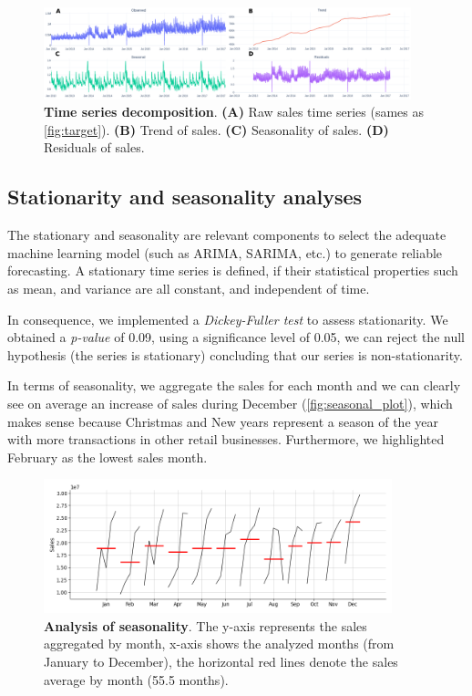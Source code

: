 \begin{figure}[!htb]
  \centering
  \includegraphics[width=0.95\textwidth]{plots/eda/timseries_decomposition.png}
  \caption[Time series decomposition]{\textbf{Time series decomposition}. \textbf{(A)} Raw sales time series (sames as \autoref{fig:target}). \textbf{(B)} Trend of sales. \textbf{(C)} Seasonality of sales. \textbf{(D)} Residuals of sales. }
  \label{fig:ts-decomposition}
\end{figure}

\subsection[Stationarity and seasonality analyses]{Stationarity and seasonality analyses}
\label{sec:st_s_analysis}


The stationary and seasonality are relevant components to select the adequate machine learning model (such as ARIMA, SARIMA, etc.) to generate reliable forecasting. A stationary time series is defined, if their statistical properties such as mean, and variance are all constant, and independent of time.

In consequence, we implemented a \textit{Dickey-Fuller test} to assess stationarity. We obtained a \textit{p-value} of 0.09, using a significance level of 0.05, we can reject the null hypothesis (the series is stationary) concluding that our series is non-stationarity.

In terms of seasonality, we aggregate the sales for each month and we can clearly see on average an increase of sales during December (\autoref{fig:seasonal_plot}), which makes sense because Christmas and New years represent a season of the year with more transactions in other retail businesses. Furthermore, we highlighted February as the lowest sales month. 

\begin{figure}[!htb]
  \centering
  \includegraphics[width=0.9\textwidth]{plots/eda/seasonal_analysis.png}
  \caption[Analysis of seasonality]{\textbf{Analysis of seasonality}. The y-axis represents the sales aggregated by month, x-axis shows the analyzed months (from January to December), the horizontal red lines denote the sales average by month (55.5 months).}
  \label{fig:seasonal_plot}
\end{figure}

